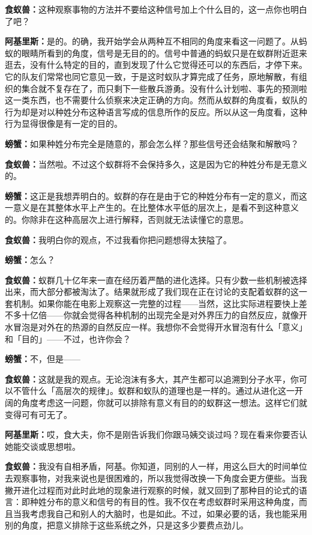 \documentclass[
  12pt,
  twoside,
  openright,
  oldfontcommands,
]{memoir}
\newcommand{\dialogname}[1]{{\heifamily\bfseries #1}}
\begin{document}
\dialogname{食蚁兽：}这种观察事物的方法并不要给这种信号加上个什么目的，这一点你也明白了吧？

\dialogname{阿基里斯：}是的。的确，我开始学会从两种互不相同的角度来看这一问题了。从蚂蚁的眼睛所看到的角度，信号是无目的的。信号中普通的蚂蚁只是在蚁群附近逛来逛去，没有什么特定的目的，直到发现了什么它觉得还可以的东西后，才停下来。它的队友们常常也同它意见一致，于是这时蚁队才算完成了任务，原地解散，有组织的集合就不复存在了，而只剩下一些散兵游勇。没有什么计划啦、事先的预测啦这一类东西，也不需要什么侦察来决定正确的方向。然而从蚁群的角度看，蚁队的行为却是对以种姓分布这种语言写成的信息所作的反应。所以从这一角度看，这种行为显得很像是有一定的目的。

\dialogname{螃蟹：}如果种姓分布完全是随意的，那会怎么样？那些信号还会结聚和解散吗？

\dialogname{食蚁兽：}当然啦。不过这个蚁群将不会保持多久，这是因为它的种姓分布是无意义的。

\dialogname{螃蟹：}这正是我想弄明白的。蚁群的存在是由于它的种姓分布有一定的意义，而这一意义是在其整体水平上产生的。在比整体水平低的层次上，是看不到这种意义的。你除非在这种高层次上进行解释，否则就无法读懂它的意思。

\dialogname{食蚁兽：}我明白你的观点，不过我看你把问题想得太狭隘了。

\dialogname{螃蟹：}怎么？

\dialogname{食蚁兽：}蚁群几十亿年来一直在经历着严酷的进化选择。只有少数一些机制被选择出来，而大部分都被淘汰了。结果就形成了我们现在正在讨论的支配着蚁群的这一套机制。如果你能在电影上观察这一完整的过程------当然，这比实际进程要快上差不多十亿倍------你就会觉得各种机制的出现完全是对外界压力的自然反应，就像开水冒泡是对外在的热源的自然反应一样。我想你不会觉得开水冒泡有什么「意义」和「目的」------不过，也许你会？

\dialogname{螃蟹：}不，但是------

\dialogname{食蚁兽：}这就是我的观点。无论泡沫有多大，其产生都可以追溯到分子水平，你可以不管什么「高层次的规律」。蚁群和蚁队的道理也是一样的。通过从进化这一开阔的角度考虑这一问题，你就可以排除有意义有目的的蚁群这一想法。这样它们就变得可有可无了。

\dialogname{阿基里斯：}哎，食大夫，你不是刚告诉我们你跟马姨交谈过吗？现在看来你要否认她能交谈或思想啦。

\dialogname{食蚁兽：}我没有自相矛盾，阿基。你知道，同别的人一样，用这么巨大的时间单位去观察事物，对我来说也是很困难的，所以我觉得改换一下角度会更方便些。当我撇开进化过程而对此时此地的现象进行观察的时候，就又回到了那种目的论式的语言：即种姓分布的意义和信号的有目的性。我不仅在考虑蚁群时采用这种角度，而且当我考虑我自己和别人的大脑时，也是如此。不过，如果必要的话，我也能采用别的角度，把意义排除于这些系统之外，只是这多少要费点劲儿。
\end{document}
